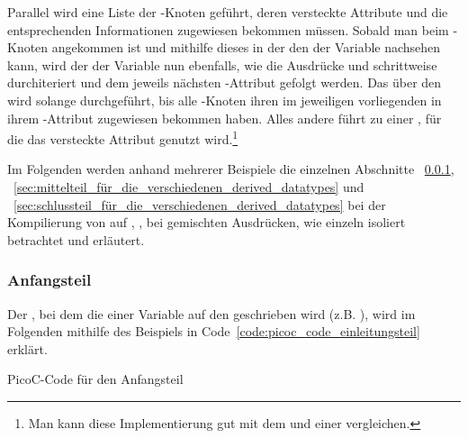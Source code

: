 \begin{Special_Paragraph}
Parallel wird eine Liste der -Knoten geführt, deren \textcolor{gray!90!black}{versteckte Attribute}  und  die entsprechenden Informationen zugewiesen bekommen müssen. Sobald man beim -Knoten angekommen ist und mithilfe dieses in der  den  der Variable nachsehen kann, wird der  der Variable nun ebenfalls, wie die Ausdrücke  und  schrittweise durchiteriert und dem jeweils nächsten -Attribut gefolgt werden. Das  über den  wird solange durchgeführt, bis alle -Knoten ihren im jeweiligen  vorliegenden  in ihrem -Attribut zugewiesen bekommen haben. Alles andere führt zu einer , für die das \textcolor{gray!90!black}{versteckte Attribut}  genutzt wird.\footnote{Man kann diese Implementierung gut mit dem  und  einer  vergleichen.}
\end{Special_Paragraph}

Im Folgenden werden anhand mehrerer Beispiele die einzelnen Abschnitte ~\ref{sec:einleitungsteil_für_globale_statische_daten_und_stackframe}, ~\ref{sec:mittelteil_für_die_verschiedenen_derived_datatypes} und ~\ref{sec:schlussteil_für_die_verschiedenen_derived_datatypes} bei der Kompilierung von  auf , ,  bei gemischten Ausdrücken, wie  einzeln isoliert betrachtet und erläutert.

\subsubsection{Anfangsteil}
\label{sec:einleitungsteil_für_globale_statische_daten_und_stackframe}
Der , bei dem die  einer Variable auf den  geschrieben wird (z.B. ), wird im Folgenden mithilfe des Beispiels in Code~\ref{code:picoc_code_einleitungsteil} erklärt.

\begin{code}
  \centering
  \caption{PicoC-Code für den Anfangsteil}
  \label{code:picoc_code_einleitungsteil}
\end{code}

